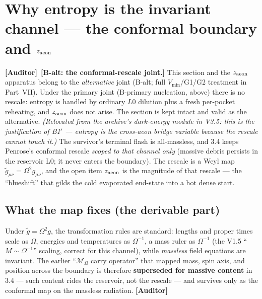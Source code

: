 \documentclass[11pt]{article}
\newcommand{\Auditor}{\textbf{\textcolor{teal!55!black}{[Auditor]}}}
\begin{document}
\section{Why entropy is the invariant channel --- the conformal boundary and $z_{\rm aeon}$}
\noindent\Auditor\ \textbf{[B-alt: the conformal-rescale joint.]} This section and the $z_{\rm aeon}$ apparatus belong to the \emph{alternative} joint (B-alt; full $V_{\min}$/G1/G2 treatment in Part~VII). Under the primary joint (B-primary nucleation, above) there is no rescale: entropy is handled by ordinary $L0$ dilution plus a fresh per-pocket reheating, and $z_{\rm aeon}$ does not arise. The section is kept intact and valid as the alternative.
\noindent\emph{(Relocated from the archive's dark-energy module in V3.5: this is the justification of B1$'$ --- entropy is the cross-aeon bridge variable because the rescale cannot touch it.)}
The survivor's terminal flash is all-massless, and 3.4 keeps Penrose's conformal rescale \emph{scoped to that channel only} (massive debris persists in the reservoir L0; it never enters the boundary). The rescale is a Weyl map $\tilde g_{\mu\nu}=\Omega^2 g_{\mu\nu}$, and the open item $z_{\rm aeon}$ is the magnitude of that rescale --- the ``blueshift'' that gilds the cold evaporated end-state into a hot dense start.

\subsection{What the map fixes (the derivable part)}
Under $\tilde g=\Omega^2 g$, the transformation rules are standard: lengths and proper times scale as $\Omega$, energies and temperatures as $\Omega^{-1}$, a mass ruler as $\Omega^{-1}$ (the V1.5 ``$M\!\sim\!\Omega^{-1}$'' scaling, correct for this channel), while \emph{massless} field equations are invariant. The earlier ``$\mathcal M_\Omega$ carry operator'' that mapped mass, spin axis, and position across the boundary is therefore \textbf{superseded for massive content} in 3.4 --- such content rides the reservoir, not the rescale --- and survives only as the conformal map on the massless radiation. \Auditor
\end{document}
